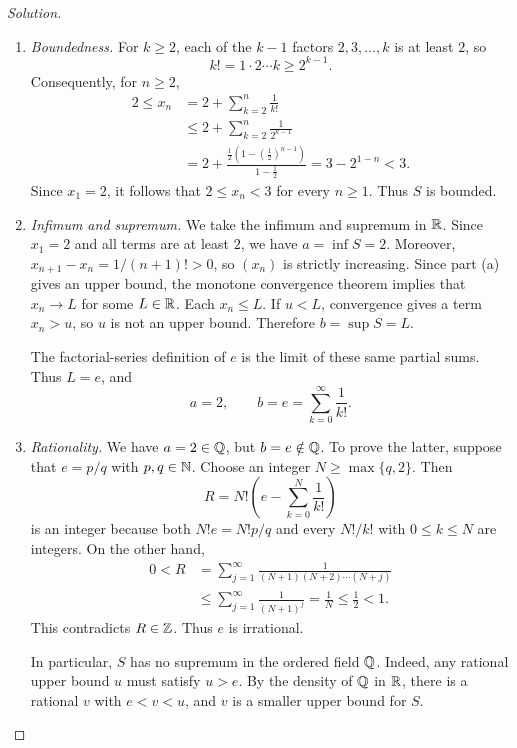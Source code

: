 \begingroup
\renewcommand{\labelenumi}{(\alph{enumi})}
\allowdisplaybreaks[1]

\begin{proof}[Solution]
\leavevmode
\begin{enumerate}
  \item \textit{Boundedness.}
    For $k\geq2$, each of the $k-1$ factors $2,3,\ldots,k$
    is at least $2$, so
    \[
      k!=1\cdot2\cdots k\geq2^{k-1}.
    \]
    Consequently, for $n\geq2$,
    \[
      \begin{aligned}
        2\leq x_n
          &=2+\sum_{k=2}^n\frac1{k!}\\
          &\leq2+\sum_{k=2}^n\frac1{2^{k-1}}\\
          &=2+\frac{\tfrac12(1-(\tfrac12)^{n-1})}{1-\tfrac12}
          =3-2^{1-n}<3.
      \end{aligned}
    \]
    Since $x_1=2$, it follows that $2\leq x_n<3$ for every
    $n\geq1$. Thus $S$ is bounded.

  \item \textit{Infimum and supremum.}
    We take the infimum and supremum in $\mathbb{R}$. Since $x_1=2$
    and all terms are at least $2$, we have $a=\inf S=2$.
    Moreover, $x_{n+1}-x_n=1/(n+1)!>0$, so $(x_n)$ is strictly
    increasing. Since part (a) gives an
    upper bound, the monotone convergence theorem implies that
    $x_n\to L$ for some $L\in\mathbb{R}$.
    Each $x_n\leq L$. If $u<L$, convergence gives a term $x_n>u$,
    so $u$ is not an upper bound. Therefore $b=\sup S=L$.

    The factorial-series definition of $e$ is the limit of these
    same partial sums. Thus $L=e$, and
    \[
      a=2,\qquad b=e=\sum_{k=0}^{\infty}\frac1{k!}.
    \]

  \item \textit{Rationality.}
    We have $a=2\in\mathbb{Q}$, but $b=e\notin\mathbb{Q}$. To prove the latter,
    suppose that $e=p/q$ with $p,q\in\mathbb{N}$. Choose an integer
    $N\geq\max\{q,2\}$. Then
    \[
      R=N!\left(e-\sum_{k=0}^N\frac1{k!}\right)
    \]
    is an integer because both $N!e=N!p/q$ and every $N!/k!$ with
    $0\leq k\leq N$ are integers. On the other hand,
    \[
      \begin{aligned}
        0<R
          &=\sum_{j=1}^{\infty}
            \frac1{(N+1)(N+2)\cdots(N+j)}\\
          &\leq\sum_{j=1}^{\infty}\frac1{(N+1)^j}
          =\frac1N\leq\frac12<1.
      \end{aligned}
    \]
    This contradicts $R\in\mathbb{Z}$. Thus $e$ is irrational.

    In particular, $S$ has no supremum in the ordered field $\mathbb{Q}$.
    Indeed, any rational upper bound $u$ must satisfy $u>e$.
    By the density of $\mathbb{Q}$ in $\mathbb{R}$, there is a rational $v$
    with $e<v<u$, and $v$ is a smaller upper bound for $S$.
\end{enumerate}
\end{proof}
\endgroup
